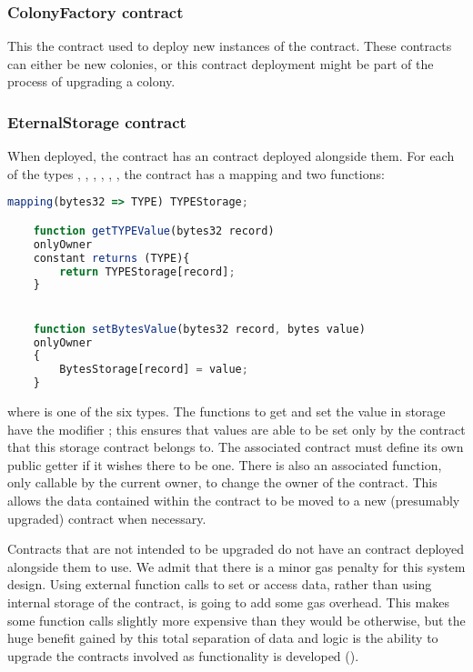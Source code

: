 \subsubsection {ColonyFactory contract}
This the contract used to deploy new instances of the  contract. These contracts can either be new colonies, or this contract deployment might be part of the process of upgrading a colony.

\subsubsection {EternalStorage contract}

When deployed, the   contract has an  contract deployed alongside them. For each of the types , , , , , , the  contract has a mapping and two functions:

\begin{minipage}[c]{0.9\linewidth}
\begin{lstlisting}[language=JavaScript]
    mapping(bytes32 => TYPE) TYPEStorage;

    function getTYPEValue(bytes32 record)
    onlyOwner 
    constant returns (TYPE){
        return TYPEStorage[record];
    }


    function setBytesValue(bytes32 record, bytes value)
    onlyOwner
    {
        BytesStorage[record] = value;
    }
\end{lstlisting}
\end{minipage}

\noindent where  is one of the six types. The functions to get and set the value in storage have the modifier ; this ensures that values are able to be set only by the contract that this storage contract belongs to. The associated contract must define its own public getter if it wishes there to be one. There is also an associated  function, only callable by the current owner, to change the owner of the contract. This allows the data contained within the contract to be moved to a new (presumably upgraded) contract when necessary. 

Contracts that are not intended to be upgraded do not have an  contract deployed alongside them to use. We admit that there is a minor gas penalty for this system design. Using external function calls to set or access data, rather than using internal storage of the contract, is going to add some gas overhead. This makes some function calls slightly more expensive than they would be otherwise, but the huge benefit gained by this total separation of data and logic is the ability to upgrade the contracts involved as functionality is developed (\cite{UpgradingContracts}). 

